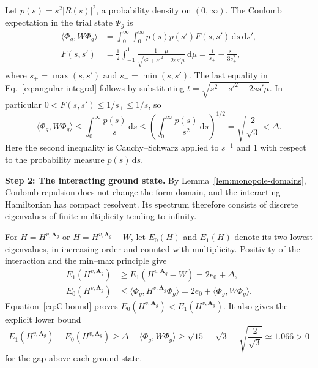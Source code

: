 \documentclass[11pt,a4paper]{article}
\theoremstyle{remark}
\theoremstyle{plain}
\newcommand{\A}{\mathbf A}
\newcommand{\ip}[2]{\langle #1,#2\rangle}
\begin{document}
Let $p(s)=s^2|R(s)|^2$, a probability density on $(0,\infty)$.
The Coulomb expectation in the trial state $\Phi_g$ is
\begin{align}
 \ip{\Phi_g}{W\Phi_g}
       &=\int_0^\infty\!\!\int_0^\infty p(s)p(s')F(s,s')\,\mathrm{d}s\,\mathrm{d}s',
       \label{eq:C}\\
 F(s,s')&=\frac12\int_{-1}^1
            \frac{1-\mu}{\sqrt{s^2+s'^2-2ss'\mu}}\,\mathrm{d}\mu
          =\frac1{s_+}-\frac{s_-}{3s_+^2},
       \label{eq:angular-integral}
\end{align}
where $s_+=\max(s,s')$ and $s_-=\min(s,s')$.
The last equality in Eq.~\eqref{eq:angular-integral} follows by
substituting $t=\sqrt{s^2+s'^2-2ss'\mu}$.
In particular $0<F(s,s')\le1/s_+\le1/s$, so
\begin{equation}
 \ip{\Phi_g}{W\Phi_g}\le\int_0^\infty\frac{p(s)}s\,\mathrm{d}s
   \le\left(\int_0^\infty\frac{p(s)}{s^2}\,\mathrm{d}s\right)^{1/2}
   =\sqrt{\frac2{\sqrt3}}<\Delta.
 \label{eq:C-bound}
\end{equation}
Here the second inequality is Cauchy--Schwarz applied to $s^{-1}$
and $1$ with respect to the probability measure $p(s)\,\mathrm{d}s$.

\noindent\textbf{Step 2: The interacting ground state.}
By Lemma~\ref{lem:monopole-domains}, Coulomb repulsion does not
change the form domain, and the interacting Hamiltonian has compact
resolvent. Its spectrum therefore consists of discrete eigenvalues
of finite multiplicity tending to infinity.

For $H=H^{v,\A_g}$ or $H=H^{v,\A_g}-W$, let $E_0(H)$ and
$E_1(H)$ denote its two lowest eigenvalues, in increasing order
and counted with multiplicity. Positivity of the interaction and the min--max
principle give
\begin{equation}
 \begin{aligned}
 E_1(H^{v,\A_g})&\ge E_1(H^{v,\A_g}-W)=2e_0+\Delta,\\
 E_0(H^{v,\A_g})&\le\ip{\Phi_g}{H^{v,\A_g}\Phi_g}=2e_0+\ip{\Phi_g}{W\Phi_g}.
 \end{aligned}
\end{equation}
Equation~\eqref{eq:C-bound} proves $E_0(H^{v,\A_g})<E_1(H^{v,\A_g})$.
It also gives the explicit
lower bound
\begin{equation}
 E_1(H^{v,\A_g})-E_0(H^{v,\A_g})\ge\Delta-\ip{\Phi_g}{W\Phi_g}
 \ge\sqrt{15}-\sqrt3-\sqrt{\frac2{\sqrt3}}
       \simeq1.066>0
 \label{eq:gap}
\end{equation}
for the gap above each ground state. 
\end{document}
